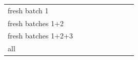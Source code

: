 {\begin{tabular}{p{0.85in}rrrrrrrr}
    fresh batch 1 & \AudScaleFreshThirtyTasks{} & \AudScaleFreshThirtyArrive{} & \AudScaleFreshThirtyEnd{} & \AudScaleFreshThirtyChanged{} & \AudScaleFreshThirtyAuditEst{} & \AudScaleFreshThirtyAuditBound{} & \AudScaleFreshThirtyHEnd{} & \AudScaleFreshThirtyHChanged{} \\
    fresh batches 1+2 & \AudScaleFreshSixtyTasks{} & \AudScaleFreshSixtyArrive{} & \AudScaleFreshSixtyEnd{} & \AudScaleFreshSixtyChanged{} & \AudScaleFreshSixtyAuditEst{} & \AudScaleFreshSixtyAuditBound{} & \AudScaleFreshSixtyHEnd{} & \AudScaleFreshSixtyHChanged{} \\
    fresh batches 1+2+3 & \AudScaleFreshNinetyTasks{} & \AudScaleFreshNinetyArrive{} & \AudScaleFreshNinetyEnd{} & \AudScaleFreshNinetyChanged{} & \AudScaleFreshNinetyAuditEst{} & \AudScaleFreshNinetyAuditBound{} & \AudScaleFreshNinetyHEnd{} & \AudScaleFreshNinetyHChanged{} \\
    all & \AudScaleAllHundredTwentyTasks{} & \AudScaleAllHundredTwentyArrive{} & \AudScaleAllHundredTwentyEnd{} & \AudScaleAllHundredTwentyChanged{} & \AudScaleAllHundredTwentyAuditEst{} & \AudScaleAllHundredTwentyAuditBound{} & \AudScaleAllHundredTwentyHEnd{} & \AudScaleAllHundredTwentyHChanged{} \\
    \bottomrule
\end{tabular}}
